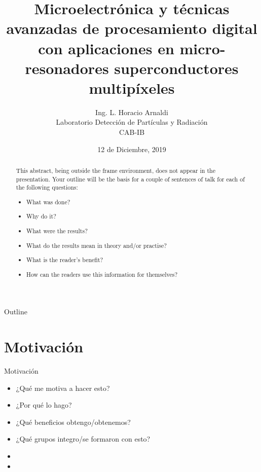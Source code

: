 \documentclass[ignorenonframetext,12pt]{beamer}
\title{Microelectrónica y técnicas avanzadas de procesamiento digital con
aplicaciones en micro-resonadores superconductores multipíxeles\\
\vspace{1cm}
\small{\color{red}{Charla de avance}}}
\author{Ing. L. Horacio Arnaldi\\
Laboratorio Detecci\'on de Part\'iculas y Radiaci\'on\\
CAB-IB}
\date{12 de Diciembre, 2019}
\begin{document}
\begin{frame}
				\maketitle
\end{frame}

\begin{abstract}
				This abstract, being outside the frame environment, does not appear in
				the presentation.  Your outline will be the basis for a couple of
				sentences of talk for each of the following questions:
				\begin{itemize}
								\item What was done?
								\item Why do it?
								\item What were the results?
								\item What do the results mean in theory and/or practise?
								\item What is the reader's benefit?
								\item How can the readers use this information for themselves? 
				\end{itemize}
\end{abstract}

\begin{frame}{Outline}
				\tableofcontents
\end{frame}

\section{Motivación}
\begin{frame}{Motivación}
				\begin{itemize}
								\item ¿Qué me motiva a hacer esto?
								\item ¿Por qué lo hago?
								\item ¿Qué beneficios obtengo/obtenemos?
								\item ¿Qué grupos integro/se formaron con esto?
								\item 
								\item 
				\end{itemize}

\end{frame}

\end{document}
